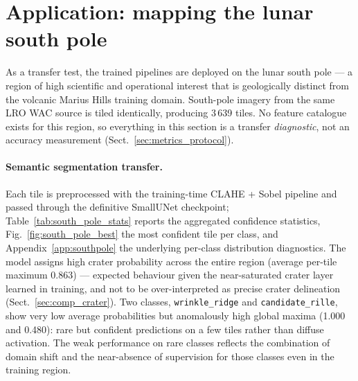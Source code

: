 \section{Application: mapping the lunar south pole}
\label{sec:southpole}

As a transfer test, the trained pipelines are deployed on the lunar south pole --- a region of high scientific and operational interest that is geologically distinct from the volcanic Marius Hills training domain. South-pole imagery from the same LRO WAC source is tiled identically, producing 3\,639 tiles. No feature catalogue exists for this region, so everything in this section is a transfer \emph{diagnostic}, not an accuracy measurement (Sect.~\ref{sec:metrics_protocol}).

\paragraph{Semantic segmentation transfer.}
Each tile is preprocessed with the training-time CLAHE + Sobel pipeline and passed through the definitive SmallUNet checkpoint; Table~\ref{tab:south_pole_stats} reports the aggregated confidence statistics, Fig.~\ref{fig:south_pole_best} the most confident tile per class, and Appendix~\ref{app:southpole} the underlying per-class distribution diagnostics. The model assigns high crater probability across the entire region (average per-tile maximum 0.863) --- expected behaviour given the near-saturated crater layer learned in training, and not to be over-interpreted as precise crater delineation (Sect.~\ref{sec:comp_crater}). Two classes, \texttt{wrinkle\_ridge} and \texttt{candidate\_rille}, show very low average probabilities but anomalously high global maxima (1.000 and 0.480): rare but confident predictions on a few tiles rather than diffuse activation. The weak performance on rare classes reflects the combination of domain shift and the near-absence of supervision for those classes even in the training region.

